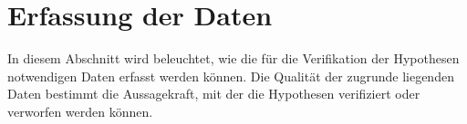 \section{Erfassung der Daten}
\label{sec:erfassung}
In diesem Abschnitt wird beleuchtet, wie die für die Verifikation der Hypothesen notwendigen Daten erfasst werden können.
Die Qualität der zugrunde liegenden Daten bestimmt die Aussagekraft, mit der die Hypothesen verifiziert oder verworfen werden können.
